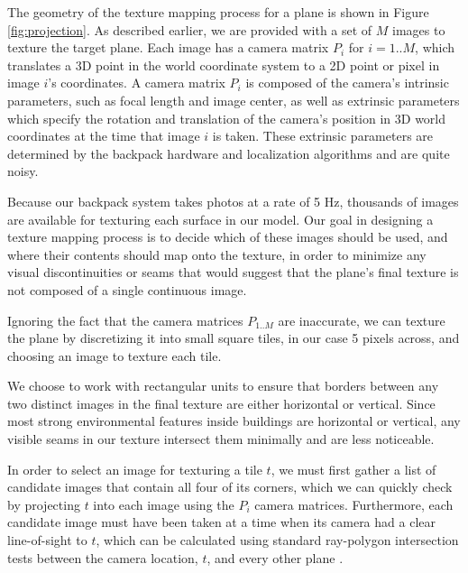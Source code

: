 \documentclass[]{spie}  %
\begin{document}
The geometry of the texture mapping process for a plane is shown in
Figure \ref{fig:projection}.  As described earlier, we are provided
with a set of $M$ images to texture the target plane. Each image has a
camera matrix $P_i$ for $i=1..M$, which translates a 3D point in the
world coordinate system to a 2D point or pixel in image $i$'s
coordinates. A camera matrix $P_i$ is composed of the camera's
intrinsic parameters, such as focal length and image center, as well
as extrinsic parameters which specify the rotation and translation of
the camera's position in 3D world coordinates at the time that image
$i$ is taken. These extrinsic parameters are determined by the
backpack hardware and localization algorithms \cite{chen2010indoor,
  liu2010indoor, kua2012loopclosure} and are quite noisy.

Because our backpack system takes photos at a rate of 5 Hz, thousands
of images are available for texturing each surface in our model. Our
goal in designing a texture mapping process is to decide which of
these images should be used, and where their contents should map onto
the texture, in order to minimize any visual discontinuities or seams
that would suggest that the plane's final texture is not composed of a
single continuous image.

Ignoring the fact that the camera matrices $P_{1..M}$ are inaccurate,
we can texture the plane by discretizing it into small square tiles,
in our case 5 pixels across, and choosing an image to texture each
tile.

We choose to work with rectangular units to ensure that borders
between any two distinct images in the final texture are either
horizontal or vertical. Since most strong environmental features
inside buildings are horizontal or vertical, any visible seams in our
texture intersect them minimally and are less noticeable.

In order to select an image for texturing a tile $t$, we must first
gather a list of candidate images that contain all four of its
corners, which we can quickly check by projecting $t$ into each image
using the $P_i$ camera matrices. Furthermore, each candidate image
must have been taken at a time when its camera had a clear
line-of-sight to $t$, which can be calculated using standard
ray-polygon intersection tests between the camera location, $t$, and
every other plane \cite{rayintersection}.
\end{document}
